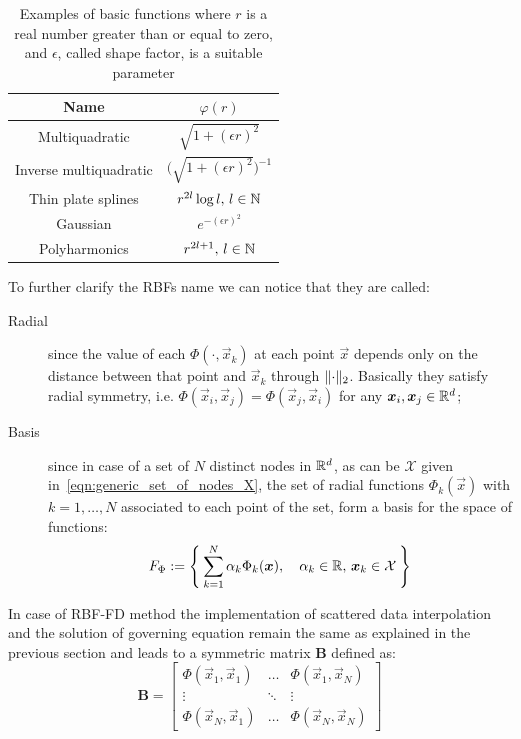 \begin{table}
	\caption{Examples of basic functions where $r$ is a real number greater than or equal to zero, and $\epsilon$, called shape factor, is a suitable parameter}
	\label{tab:basic_functions}
	\centering
	\begin{tabular}{cc}
		\toprule
		Name										&  $\varphi(r)$																	\\
		\midrule
		Multiquadratic					 			&  $\sqrt{1+(\epsilon r)^2}$													\\
		Inverse multiquadratic	 					&  $\big(  \sqrt{1 + (\epsilon r)^2}  \big)^{-1}$  								\\
		Thin plate splines			   				&  $r^{2l} \log l, \, l\in\mathbb{N}$													\\
		Gaussian							    	&  $e^{- (\epsilon r)^2}$												  		\\
		Polyharmonics								&  $r^{2l + 1}, \, l\in\mathbb{N}$														\\
		\bottomrule
	\end{tabular}
\end{table}

To further clarify the RBFs name we can notice that they are called:
\begin{description}
	\item[Radial] since the value of each $\Phi(\cdot, \vec{x}_k)$ at each point $\vec{x}$ depends only on the distance between that point and $\vec{x}_k$ through $\lVert\cdot\rVert_2$. Basically they satisfy radial symmetry, i.e. $\Phi(\vec{x}_i, \vec{x}_j) = \Phi(\vec{x}_j, \vec{x}_i)$ for any $\boldsymbol{x}_i, \boldsymbol{x}_j \in \mathbb{R}^d$;
	\item[Basis] since in case of a set of $N$ distinct nodes in $\mathbb{R}^d$, as can be $\mathcal{X}$ given in~\eqref{eqn:generic_set_of_nodes_X}, the set of radial functions $\Phi_k{(\vec{x})}$ with $k=1, \dots, N$ associated to each point of the set, form a basis for the space of functions:
	\[
	F_{\Phi} := \Set{ \sum_{k=1}^{N} \alpha_k \Phi_k{(\boldsymbol{x})},  \quad \alpha_k \in\mathbb{R}, \, \boldsymbol{x}_k \in \mathcal{X}}
	\]
\end{description}

In case of RBF-FD method the implementation of scattered data interpolation and the solution of governing equation remain the same as explained in the previous section and leads to a symmetric matrix $\boldsymbol{B}$ defined as:
\begin{equation}
	\boldsymbol{B} =
	\begin{bmatrix}
		\Phi(\vec{x}_1, \vec{x}_1)  & 	\dots 	& 	\Phi(\vec{x}_1, \vec{x}_N)  \\
		\vdots											& \ddots &  \vdots											  \\
		\Phi(\vec{x}_N, \vec{x}_1)  & 	\dots 	& 	\Phi(\vec{x}_N, \vec{x}_N)
	\end{bmatrix}
\end{equation}

